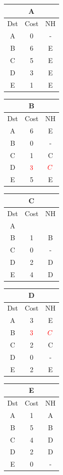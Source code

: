 \documentclass[10pt]{article}
\begin{document}
	\begin{table}[h!]
		\begin{tabular}{|c||c||c|}
 			\hline
	 		\multicolumn{3}{|c|}{A} \\
 			\hline
 			Dst & Cost & NH\\
 			\hline
 			A & 0 & - \\
 			B & 6 & E \\
 			C & 5 & E  \\
 			D & 3 & E \\
 			E & 1 & E \\
 			\hline
		\end{tabular}
		\begin{tabular}{|c||c||c|}
 			\hline
	 		\multicolumn{3}{|c|}{B} \\
 			\hline
 			Dst & Cost & NH\\
 			\hline
 			A & 6 & E \\
 			B & 0 & - \\
 			C & 1 & C  \\
 			D & $\color{red} 3$  & $\color{red} C$ \\
 			E & 5 & E \\
 			\hline
		\end{tabular}
		\begin{tabular}{|c||c||c|}
 			\hline
	 		\multicolumn{3}{|c|}{C} \\
 			\hline
 			Dst & Cost & NH\\
 			\hline
 			A &   &   \\
 			B & 1 & B \\
 			C & 0 & - \\
 			D & 2 & D \\
 			E & 4 & D \\
 			\hline
		\end{tabular}
		\begin{tabular}{|c||c||c|}
 			\hline
	 		\multicolumn{3}{|c|}{D} \\
 			\hline
 			Dst & Cost & NH\\
 			\hline
 			A & 3 & E \\
 			B & $\color{red} 3$  & $\color{red} C$ \\
 			C & 2 & C \\
 			D & 0 & - \\
 			E & 2 & E \\
 			\hline
		\end{tabular}
		\begin{tabular}{|c||c||c|}
 			\hline
	 		\multicolumn{3}{|c|}{E} \\
 			\hline
 			Dst & Cost & NH\\
 			\hline
 			A & 1 & A \\
 			B & 5 & B \\
 			C & 4 & D  \\
 			D & 2 & D \\
 			E & 0 & - \\
 			\hline
		\end{tabular}
	\end{table}
\end{document}
